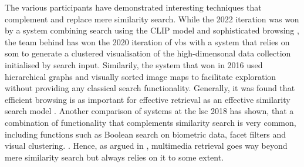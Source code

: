 The various participants have demonstrated interesting techniques that complement and replace mere similarity search. While the 2022 iteration was won by a system combining search using the CLIP model \cite{Radford:2021Learning} and sophisticated browsing \cite{Hezel:2022Efficient}, the team behind \cite{Kratochvil:2020SOM} has won the 2020 iteration of \acrshort{vbs} with a system that relies on \acrfull{som} \cite{Kohonen:1990Self} to generate a clustered visualisation of the high-dimensonal data collection initialised by search input. Similarily, the system that won in 2016 used \cite{Barthel:2016Navigating} hierarchical graphs and visually sorted image maps to facilitate exploration without providing any classical search functionality. Generally, it was found that efficient browsing is as important for effective retrieval as an effective similarity search model \cite{Lokovc:2019Interactive}. Another comparison of systems at the \acrshort{lsc} 2018 has shown, that a combination of functionality that complements similarity search is very common, including functions such as Boolean search on biometric data, facet filters and visual clustering. \cite{Gurrin:2019Invited}. Hence, as argued in , multimedia retrieval goes way beyond mere similarity search but always relies on it to some extent.